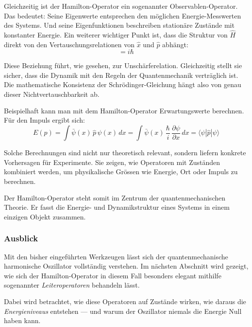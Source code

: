 		Gleichzeitig ist der Hamilton-Operator ein sogenannter Observablen-Operator.
		Das bedeutet:
		Seine Eigenwerte entsprechen den möglichen Energie-Messwerten des Systems.
		Und seine Eigenfunktionen beschreiben stationäre Zustände mit konstanter Energie.
		Ein weiterer wichtiger Punkt ist, dass die Struktur von \( \hat{H} \) direkt von den Vertauschungsrelationen von \( \hat{x} \) und \( \hat{p} \) abhängt:
		\begin{equation}
			[\hat{x}, \hat{p}] = i \hbar
		\end{equation}

		Diese Beziehung führt, wie gesehen, zur Unschärferelation.
		Gleichzeitig stellt sie sicher, dass die Dynamik mit den Regeln der Quantenmechanik verträglich ist.
		Die mathematische Konsistenz der Schrödinger-Gleichung hängt also von genau dieser Nichtvertauschbarkeit ab.

		Beispielhaft kann man mit dem Hamilton-Operator Erwartungswerte berechnen.
		Für den Impuls ergibt sich:
		\begin{equation}
			E(p) = \int \bar{\psi}(x) \, \hat{p} \, \psi(x) \, dx 
			= \int \bar{\psi}(x) \, \frac{\hbar}{i} \, \frac{\partial \psi}{\partial x} \, dx 
			= \langle \psi | \hat{p} | \psi \rangle
		\end{equation}


		Solche Berechnungen sind nicht nur theoretisch relevant, sondern liefern konkrete Vorhersagen für Experimente.
		Sie zeigen, wie Operatoren mit Zuständen kombiniert werden, um physikalische Grössen wie Energie, Ort oder Impuls zu berechnen.

		Der Hamilton-Operator steht somit im Zentrum der quantenmechanischen Theorie.
		Er fasst die Energie- und Dynamikstruktur eines Systems in einem einzigen Objekt zusammen.

	\subsubsection{Ausblick\label{fourier:subsubsection:Ausblick}}
		Mit den bisher eingeführten Werkzeugen lässt sich der quantenmechanische harmonische Oszillator vollständig verstehen.
		Im nächsten Abschnitt wird gezeigt, wie sich der Hamilton-Operator in diesem Fall besonders elegant mithilfe sogenannter \emph{Leiteroperatoren} behandeln lässt.

		Dabei wird betrachtet, wie diese Operatoren auf Zustände wirken, wie daraus die \emph{Energieniveaus} entstehen ---
		und warum der Oszillator niemals die Energie Null haben kann.

